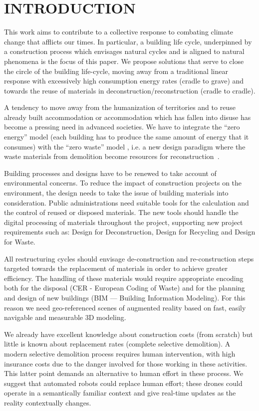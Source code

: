 \section{\uppercase{Introduction}}
\label{sec:introduction}




This work aims to contribute to a collective response to combating climate change that afflicts our times. In particular, a building life cycle, underpinned by a construction process which envisages natural cycles and is aligned to natural phenomena is the focus of this paper. We propose solutions that serve to close the circle of the building life-cycle, moving away from a traditional linear response with excessively high consumption energy rates (cradle to grave) and towards the reuse of materials in deconstruction/reconstruction (cradle to cradle).

A tendency to move away from the humanization of territories and to reuse already  built accommodation or accommodation which has fallen into disuse has become a pressing need in advanced societies. We have to integrate the ``zero energy'' model (each building has to produce the same amount of energy that it consumes) with the ``zero waste'' model , i.e. a new design paradigm where the waste materials from demolition become resources for reconstruction~\cite{altamura:12}.

Building processes and designs have to be renewed to take account of environmental concerns. To reduce the impact of construction projects on the environment, the design needs to take the issue of building materials into consideration. Public administrations need suitable tools for the calculation and the control of reused or disposed materials. The new tools should handle the digital processing of materials throughout the project, supporting new project requirements such as: Design for Deconstruction, Design for Recycling and Design for Waste.

All restructuring cycles should envisage de-construction and re-construction steps targeted towards the replacement of materials in order to achieve greater efficiency. The handling of these materials would require appropriate encoding both for the disposal (CER - European Coding of Waste) and for the planning and design of new buildings (BIM --- Building Information Modeling). For this reason we need geo-referenced scenes of augmented reality based on fast, easily navigable and measurable 3D modeling. 

We already have excellent knowledge about construction costs (from scratch) but little is known about replacement rates (complete selective demolition). A modern selective demolition process requires human intervention, with high insurance costs due to the danger involved for those working in these activities. This latter point demands an alternative to human effort in these process. We suggest that automated robots could replace human effort; these drones could operate in a semantically familiar context and give real-time updates as the reality contextually changes. 

